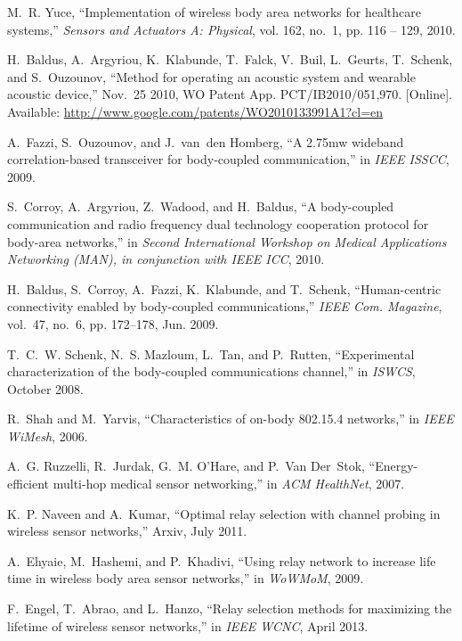 \documentclass[10pt]{IEEEtran}
\begin{document}
\begin{thebibliography}{10}
M.~R. Yuce, ``Implementation of wireless body area networks for healthcare
  systems,'' \emph{Sensors and Actuators A: Physical}, vol. 162, no.~1, pp. 116
  -- 129, 2010.

\BIBentryALTinterwordspacing
H.~Baldus, A.~Argyriou, K.~Klabunde, T.~Falck, V.~Buil, L.~Geurts, T.~Schenk,
  and S.~Ouzounov, ``Method for operating an acoustic system and wearable
  acoustic device,'' Nov.~25 2010, {WO} Patent App. PCT/IB2010/051,970.
  [Online]. Available: \url{http://www.google.com/patents/WO2010133991A1?cl=en}
\BIBentrySTDinterwordspacing

A.~Fazzi, S.~Ouzounov, and J.~van~den Homberg, ``A 2.75mw wideband
  correlation-based transceiver for body-coupled communication,'' in \emph{IEEE
  ISSCC}, 2009.

S.~Corroy, A.~Argyriou, Z.~Wadood, and H.~Baldus, ``A body-coupled
  communication and radio frequency dual technology cooperation protocol for
  body-area networks,'' in \emph{Second International Workshop on Medical
  Applications Networking (MAN), in conjunction with IEEE ICC}, 2010.

H.~Baldus, S.~Corroy, A.~Fazzi, K.~Klabunde, and T.~Schenk, ``Human-centric
  connectivity enabled by body-coupled communications,'' \emph{{IEEE} Com.
  Magazine}, vol.~47, no.~6, pp. 172--178, Jun. 2009.

T.~C.~W. Schenk, N.~S. Mazloum, L.~Tan, and P.~Rutten, ``Experimental
  characterization of the body-coupled communications channel,'' in
  \emph{ISWCS}, October 2008.

R.~Shah and M.~Yarvis, ``Characteristics of on-body 802.15.4 networks,'' in
  \emph{IEEE WiMesh}, 2006.

A.~G. Ruzzelli, R.~Jurdak, G.~M. O'Hare, and P.~Van Der~Stok,
  ``Energy-efficient multi-hop medical sensor networking,'' in \emph{ACM
  HealthNet}, 2007.

K.~P. Naveen and A.~Kumar, ``Optimal relay selection with channel probing in
  wireless sensor networks,'' Arxiv, July 2011.

A.~Ehyaie, M.~Hashemi, and P.~Khadivi, ``Using relay network to increase life
  time in wireless body area sensor networks,'' in \emph{WoWMoM}, 2009.

F.~Engel, T.~Abrao, and L.~Hanzo, ``Relay selection methods for maximizing the
  lifetime of wireless sensor networks,'' in \emph{IEEE WCNC}, April 2013.


\end{thebibliography}
\end{document}
